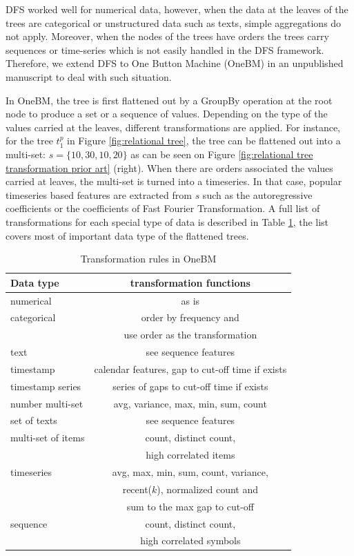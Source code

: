 DFS worked well for numerical data, however, when the data at the leaves of the trees are categorical or unstructured data such as texts, simple aggregations do not apply. Moreover, when the nodes of the trees have orders the trees carry sequences or time-series which is not easily handled in the DFS framework. Therefore, we extend DFS to One Button Machine (OneBM) in an unpublished manuscript \cite{onebm} to deal with such situation. 

In OneBM, the tree is first flattened out by a GroupBy operation at the root node to produce a set or a sequence of values. Depending on the type of the values carried at the leaves, different transformations are applied. For instance, for the tree $t^p_1$ in Figure \ref{fig:relational tree}, the tree can be flattened out into a multi-set: $s = \{10, 30, 10, 20\}$ as can be seen on Figure \ref{fig:relational tree transformation prior art} (right). When there are orders associated the values carried at leaves, the multi-set is turned into a timeseries. In that case, popular timeseries based features are extracted from $s$ such as the autoregressive coefficients or the coefficients of Fast Fourier Transformation. A full list of transformations for each special type of data is described in Table \ref{tab:rules}, the list covers most of important data type of the flattened trees.

\begin{table}
  \caption {Transformation rules in OneBM} \label{tab:rules} 
  \begin{tabular}{ | l | c | }
    \hline
    \textbf{Data type} & \textbf{transformation functions} \\ \hline
    numerical &  as is  \\ \hline
    categorical & order by frequency and \\
    & use order as the transformation  \\ \hline
    text & see sequence features \\ \hline
    timestamp & calendar features, gap to cut-off time if exists \\ \hline
    timestamp series & series of gaps to cut-off time if exists \\ \hline
    number multi-set & avg, variance, max, min, sum, count \\ \hline
    set of texts & see sequence features \\ \hline
	multi-set of items & count, distinct count, \\ & high correlated items \\ \hline
	timeseries &  avg, max, min, sum, count, variance, \\ &recent($k$), normalized count and \\ & sum to the max gap to cut-off   \\ \hline
	sequence & count, distinct count, \\& high correlated symbols \\ 
    \hline
  \end{tabular}
\end{table}

